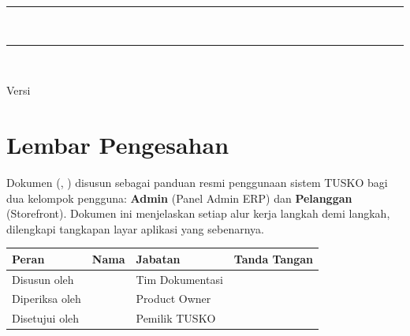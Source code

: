 \thispagestyle{empty}
\begin{center}
  \vspace*{2cm}
  {\color{tuskoamber}\rule{\linewidth}{3pt}}\\[1.5cm]
  {\Huge\bfseries\color{tuskodark} \DocTitle\par}
  \vspace{0.6cm}
  {\Large\color{tuskogray} \DocSubtitle\par}
  \vspace{1.2cm}
  {\color{tuskoamber}\rule{\linewidth}{1pt}}\\[2cm]
  {\large Versi \DocVersion\par}
  {\large \DocDate\par}
  \vfill
  {\large\bfseries \DocOrg\par}
  \vspace*{1cm}
\end{center}
\clearpage

\section*{Lembar Pengesahan}
Dokumen \emph{\DocTitle} (\DocVersion, \DocDate) disusun sebagai panduan resmi
penggunaan sistem TUSKO bagi dua kelompok pengguna: \textbf{Admin} (Panel Admin ERP)
dan \textbf{Pelanggan} (Storefront). Dokumen ini menjelaskan setiap alur kerja
langkah demi langkah, dilengkapi tangkapan layar aplikasi yang sebenarnya.

\vspace{0.8cm}
\begin{center}
\renewcommand{\arraystretch}{1.6}
\begin{tabular}{|l|l|l|l|}
\hline
\textbf{Peran} & \textbf{Nama} & \textbf{Jabatan} & \textbf{Tanda Tangan} \\ \hline
Disusun oleh &  & Tim Dokumentasi &  \\ \hline
Diperiksa oleh &  & Product Owner &  \\ \hline
Disetujui oleh &  & Pemilik TUSKO &  \\ \hline
\end{tabular}
\end{center}
\clearpage

